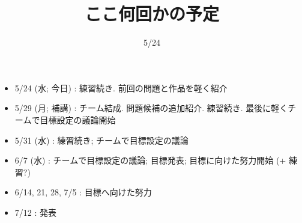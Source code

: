 \documentclass[12pt,dvipdfmx]{beamer}
\title{ここ何回かの予定}
\institute{東京大学}
\author{}
\date{5/24}
\begin{document}
\maketitle

\begin{frame}
\begin{itemize}
\item 5/24 (水; 今日) : 練習続き. 前回の問題と作品を軽く紹介
\item 5/29 (月; 補講) : チーム結成. 問題候補の追加紹介. 練習続き.
  最後に軽くチームで目標設定の議論開始
\item 5/31 (水) : 練習続き; チームで目標設定の議論
\item 6/7 (水) : チームで目標設定の議論; 目標発表; 目標に向けた努力開始 (+ 練習?)
\item 6/14, 21, 28, 7/5 : 目標へ向けた努力
\item 7/12 : 発表
\end{itemize}
\end{frame}



  
\end{document}
